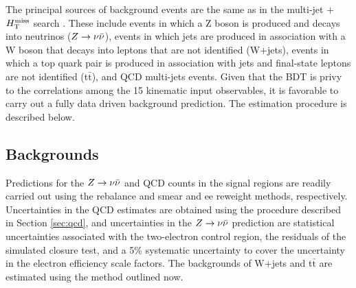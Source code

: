 The principal sources of background events are the same as in the multi-jet $+$ $H_{\text{T}}^{\rm miss}$ search \cite{Khachatryan:2016kdk}. These include events in which a Z boson is produced and decays into neutrinos ($Z\rightarrow \nu\bar{\nu}$), events in which jets are produced in association with a W boson that decays into leptons that are not identified (W$+$jets), events in which a top quark pair is produced in association with jets and final-state leptons are not identified (t$\bar{\text{t}}$), and QCD multi-jets events. Given that the BDT is privy to the correlations among the 15 kinematic input observables, it is favorable to carry out a fully data driven background prediction. The estimation procedure is described below.

\subsection{Backgrounds}
Predictions for the $Z\rightarrow \nu\bar{\nu}$ and QCD counts in the signal regions are readily carried out using the rebalance and smear and ee reweight methods, respectively. Uncertainties in the QCD estimates are obtained using the procedure described in Section \ref{sec:qcd}, and uncertainties in the $Z\rightarrow \nu\bar{\nu}$ prediction are statistical uncertainties associated with the two-electron control region, the residuals of the simulated closure test, and a 5\% systematic uncertainty to cover the uncertainty in the electron efficiency scale factors. The backgrounds of W$+$jets and t$\bar{\text{t}}$ are estimated using the method outlined now. 

